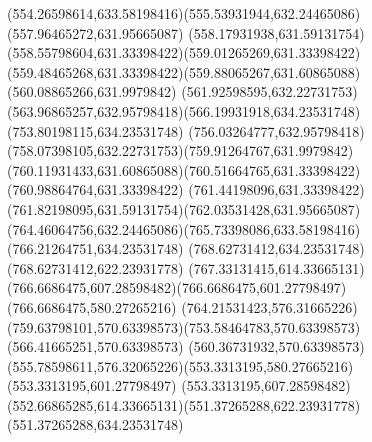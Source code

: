 {{	\curveto(554.26598614,633.58198416)(555.53931944,632.24465086)(557.96465272,631.95665087)
	\curveto(558.17931938,631.59131754)(558.55798604,631.33398422)(559.01265269,631.33398422)
	\curveto(559.48465268,631.33398422)(559.88065267,631.60865088)(560.08865266,631.9979842)
	\curveto(561.92598595,632.22731753)(563.96865257,632.95798418)(566.19931918,634.23531748)
	\lineto(753.80198115,634.23531748)
	\curveto(756.03264777,632.95798418)(758.07398105,632.22731753)(759.91264767,631.9979842)
	\curveto(760.11931433,631.60865088)(760.51664765,631.33398422)(760.98864764,631.33398422)
	\curveto(761.44198096,631.33398422)(761.82198095,631.59131754)(762.03531428,631.95665087)
	\curveto(764.46064756,632.24465086)(765.73398086,633.58198416)(766.21264751,634.23531748)
	\lineto(768.62731412,634.23531748)
	\lineto(768.62731412,622.23931778)
	\curveto(767.33131415,614.33665131)(766.6686475,607.28598482)(766.6686475,601.27798497)
	\lineto(766.6686475,580.27265216)
	\curveto(764.21531423,576.31665226)(759.63798101,570.63398573)(753.58464783,570.63398573)
	\lineto(566.41665251,570.63398573)
	\curveto(560.36731932,570.63398573)(555.78598611,576.32065226)(553.3313195,580.27665216)
	\lineto(553.3313195,601.27798497)
	\curveto(553.3313195,607.28598482)(552.66865285,614.33665131)(551.37265288,622.23931778)
	\lineto(551.37265288,634.23531748)
	\closepath
}
}
